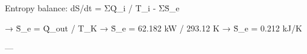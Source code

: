 Entropy balance:  
dS/dt = ΣQ̇_i / T_i - ΣṠ_e  

→ Ṡ_e = Q̇_out / T_K  
→ Ṡ_e = 62.182 kW / 293.12 K  
→ Ṡ_e = 0.212 kJ/K  

---